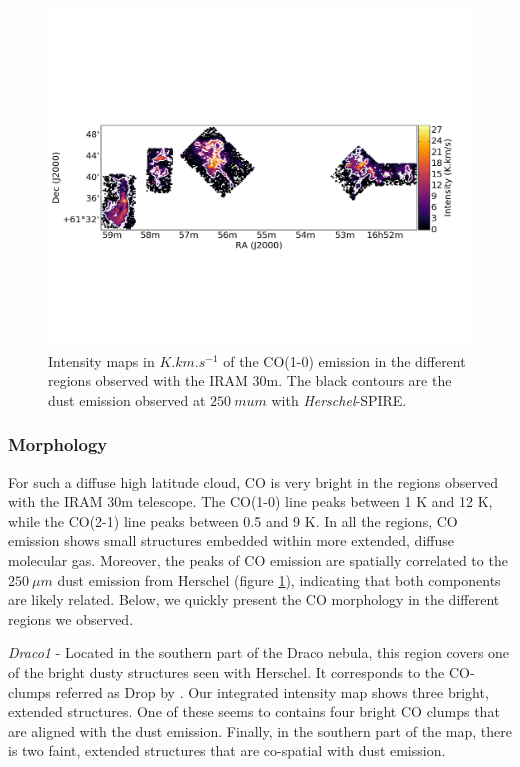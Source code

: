 \documentclass[traditabstract]{aa}
\begin{document}
\begin{figure}[h]
  \centering
  \includegraphics[width=\linewidth,trim=0 250 0 250,clip=true]{Figures/Draco_FRONT_intensity.png}
  \caption{\label{Draco_CO10} Intensity maps in $K.km.s^{-1}$ of the CO(1-0) emission in the different regions observed with the IRAM 30m. The black contours are the dust emission observed at $250\: mu m$ with \emph{Herschel}-SPIRE.}
\end{figure}


      \subsubsection{Morphology}

   For such a diffuse high latitude cloud, CO is very bright in the regions observed with the IRAM 30m telescope. The CO(1-0) line peaks between 1 K and 12 K, while the CO(2-1) line peaks between 0.5 and 9 K. In all the regions, CO emission shows small structures embedded within more extended, diffuse molecular gas. Moreover, the peaks of CO emission are spatially correlated to the $250\: \mu m$ dust emission from Herschel (figure \ref{Draco_CO10}), indicating that both components are likely related. Below, we quickly present the CO morphology in the different regions we observed.
\medskip

\noindent \textit{Draco1} - Located in the southern part of the Draco nebula, this region covers one of the bright dusty structures seen with Herschel. It corresponds to the CO-clumps referred as Drop by \cite{Mebold_1985}. Our integrated intensity map shows three bright, extended structures. One of these seems to contains four bright CO clumps that are aligned with the dust emission. Finally, in the southern part of the map, there is two faint, extended structures that are co-spatial with dust emission.
\medskip
\end{document}
